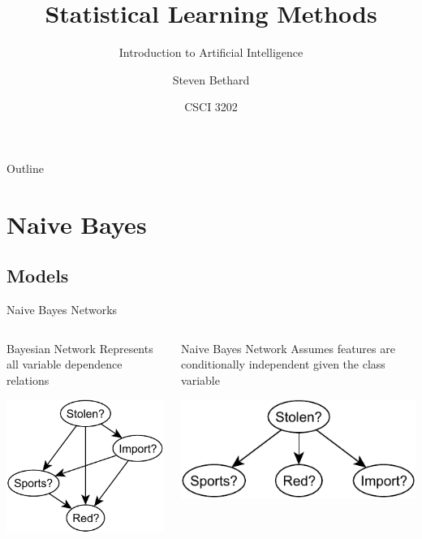 \documentclass[12pt]{beamer}
\title{Statistical Learning Methods}
\subtitle{Introduction to Artificial Intelligence}
\author{Steven Bethard}
\institute{
  Department of Computer Science\\
  University of Colorado
}
\date{CSCI 3202}
\begin{document}
\begin{frame}
	\titlepage
\end{frame}

\begin{frame}{Outline}
	\tableofcontents
\end{frame}

\section{Naive Bayes}
\subsection{Models}
\begin{frame}{Naive Bayes Networks}
	\begin{columns}[t]
		\begin{column}{2in}
			\begin{block}{Bayesian Network}
				Represents all variable dependence relations
			\end{block}
			\begin{center}
				\includegraphics[scale=.75]{stolen-bayes-net}
			\end{center}
		\end{column}
		\pause
		\begin{column}{2in}
			\begin{block}{Naive Bayes Network}
				Assumes features are conditionally independent given the class variable
			\end{block}
			\begin{center}
				\includegraphics[scale=.75]{stolen-naive-bayes}
			\end{center}
		\end{column}
	\end{columns}
\end{frame}
\end{document}
